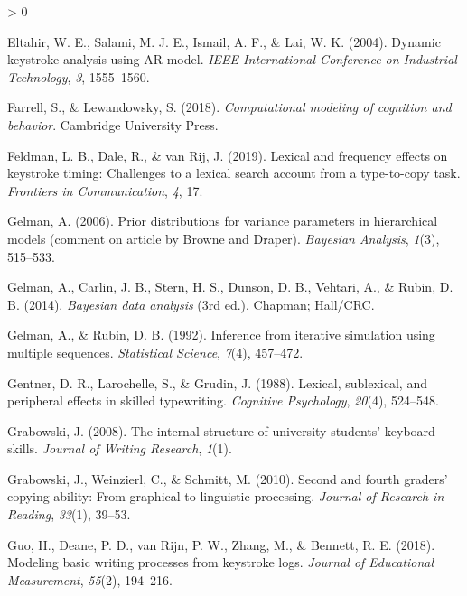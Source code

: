 \documentclass[
  english,
  man,mask,floatsintext]{apa7}
\newlength{\cslhangindent}
\newenvironment{CSLReferences}[2] %
 {%
  \setlength{\parindent}{0pt}
  \ifodd #1 \everypar{\setlength{\hangindent}{\cslhangindent}}\ignorespaces\fi
  \ifnum #2 > 0
  \setlength{\parskip}{#2\baselineskip}
  \fi
 }%
 {}
\begin{document}
\begin{CSLReferences}{1}{0}
\leavevmode\hypertarget{ref-eltahir2004dynamic}{}%
Eltahir, W. E., Salami, M. J. E., Ismail, A. F., \& Lai, W. K. (2004). Dynamic keystroke analysis using {AR} model. \emph{IEEE International Conference on Industrial Technology}, \emph{3}, 1555--1560.

\leavevmode\hypertarget{ref-farrell2018computational}{}%
Farrell, S., \& Lewandowsky, S. (2018). \emph{Computational modeling of cognition and behavior}. Cambridge University Press.

\leavevmode\hypertarget{ref-feldman2019lexical}{}%
Feldman, L. B., Dale, R., \& van Rij, J. (2019). Lexical and frequency effects on keystroke timing: Challenges to a lexical search account from a type-to-copy task. \emph{Frontiers in Communication}, \emph{4}, 17.

\leavevmode\hypertarget{ref-gelman2006prior}{}%
Gelman, A. (2006). Prior distributions for variance parameters in hierarchical models (comment on article by {Browne and Draper}). \emph{Bayesian Analysis}, \emph{1}(3), 515--533.

\leavevmode\hypertarget{ref-gelman2014}{}%
Gelman, A., Carlin, J. B., Stern, H. S., Dunson, D. B., Vehtari, A., \& Rubin, D. B. (2014). \emph{Bayesian data analysis} (3rd ed.). Chapman; Hall/CRC.

\leavevmode\hypertarget{ref-gelman1992}{}%
Gelman, A., \& Rubin, D. B. (1992). Inference from iterative simulation using multiple sequences. \emph{Statistical Science}, \emph{7}(4), 457--472.

\leavevmode\hypertarget{ref-gen88}{}%
Gentner, D. R., Larochelle, S., \& Grudin, J. (1988). Lexical, sublexical, and peripheral effects in skilled typewriting. \emph{Cognitive Psychology}, \emph{20}(4), 524--548.

\leavevmode\hypertarget{ref-grabowski2008internal}{}%
Grabowski, J. (2008). The internal structure of university students' keyboard skills. \emph{Journal of Writing Research}, \emph{1}(1).

\leavevmode\hypertarget{ref-grabowski2010second}{}%
Grabowski, J., Weinzierl, C., \& Schmitt, M. (2010). Second and fourth graders' copying ability: From graphical to linguistic processing. \emph{Journal of Research in Reading}, \emph{33}(1), 39--53.

\leavevmode\hypertarget{ref-guo2018modeling}{}%
Guo, H., Deane, P. D., van Rijn, P. W., Zhang, M., \& Bennett, R. E. (2018). Modeling basic writing processes from keystroke logs. \emph{Journal of Educational Measurement}, \emph{55}(2), 194--216.


\end{CSLReferences}
\end{document}
